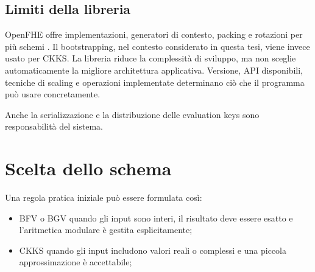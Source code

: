 \subsection{Limiti della libreria}
OpenFHE offre implementazioni, generatori di contesto, packing e rotazioni per pi\`u schemi \cite{openfhe}. Il bootstrapping, nel contesto considerato in questa tesi, viene invece usato per CKKS. La libreria riduce la complessit\`a di sviluppo, ma non sceglie automaticamente la migliore architettura applicativa. Versione, API disponibili, tecniche di scaling e operazioni implementate determinano ci\`o che il programma pu\`o usare concretamente.

Anche la serializzazione e la distribuzione delle evaluation keys sono responsabilit\`a del sistema.

\section{Scelta dello schema}
Una regola pratica iniziale pu\`o essere formulata cos\`i:
\begin{itemize}
  \item BFV o BGV quando gli input sono interi, il risultato deve essere esatto e l'aritmetica modulare \`e gestita esplicitamente;
  \item CKKS quando gli input includono valori reali o complessi e una piccola approssimazione \`e accettabile;
\end{itemize}